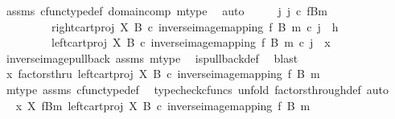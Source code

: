 \begin{isabellebody}
\ assms\ cfunc{\isacharunderscore}{\kern0pt}type{\isacharunderscore}{\kern0pt}def\ domain{\isacharunderscore}{\kern0pt}comp\ m{\isacharunderscore}{\kern0pt}type\ \isamarkupfalse%
\ auto\isanewline
\ \ \isamarkupfalse%
\ \isamarkupfalse%
\ {\isachardoublequoteopen}{\isasymexists}j{\isachardot}{\kern0pt}\ j\ {\isasymin}\isactrlsub c\ {\isacharparenleft}{\kern0pt}f\isactrlsup {\isacharminus}{\kern0pt}B{\isasymrparr}\isactrlbsub m\isactrlesub {\isacharparenright}{\kern0pt}\ {\isasymand}\isanewline
\ \ \ \ \ \ \ \ \ {\isacharparenleft}{\kern0pt}right{\isacharunderscore}{\kern0pt}cart{\isacharunderscore}{\kern0pt}proj\ X\ B\ {\isasymcirc}\isactrlsub c\ inverse{\isacharunderscore}{\kern0pt}image{\isacharunderscore}{\kern0pt}mapping\ f\ B\ m{\isacharparenright}{\kern0pt}\ {\isasymcirc}\isactrlsub c\ j\ {\isacharequal}{\kern0pt}\ h\ {\isasymand}\isanewline
\ \ \ \ \ \ \ \ \ {\isacharparenleft}{\kern0pt}left{\isacharunderscore}{\kern0pt}cart{\isacharunderscore}{\kern0pt}proj\ X\ B\ {\isasymcirc}\isactrlsub c\ inverse{\isacharunderscore}{\kern0pt}image{\isacharunderscore}{\kern0pt}mapping\ f\ B\ m{\isacharparenright}{\kern0pt}\ {\isasymcirc}\isactrlsub c\ j\ {\isacharequal}{\kern0pt}\ x{\isachardoublequoteclose}\isanewline
\ \ \ \ \isamarkupfalse%
\ inverse{\isacharunderscore}{\kern0pt}image{\isacharunderscore}{\kern0pt}pullback\ assms\ m{\isacharunderscore}{\kern0pt}type\ \isamarkupfalse%
\ is{\isacharunderscore}{\kern0pt}pullback{\isacharunderscore}{\kern0pt}def\ \isamarkupfalse%
\ blast\isanewline
\ \ \isamarkupfalse%
\ \isamarkupfalse%
\ {\isachardoublequoteopen}x\ factorsthru\ {\isacharparenleft}{\kern0pt}left{\isacharunderscore}{\kern0pt}cart{\isacharunderscore}{\kern0pt}proj\ X\ B\ {\isasymcirc}\isactrlsub c\ inverse{\isacharunderscore}{\kern0pt}image{\isacharunderscore}{\kern0pt}mapping\ f\ B\ m{\isacharparenright}{\kern0pt}{\isachardoublequoteclose}\isanewline
\ \ \ \ \isamarkupfalse%
\ m{\isacharunderscore}{\kern0pt}type\ assms\ cfunc{\isacharunderscore}{\kern0pt}type{\isacharunderscore}{\kern0pt}def\ \isamarkupfalse%
\ {\isacharparenleft}{\kern0pt}typecheck{\isacharunderscore}{\kern0pt}cfuncs{\isacharcomma}{\kern0pt}\ unfold\ factors{\isacharunderscore}{\kern0pt}through{\isacharunderscore}{\kern0pt}def{\isacharcomma}{\kern0pt}\ auto{\isacharparenright}{\kern0pt}\isanewline
\ \ \isamarkupfalse%
\ \isamarkupfalse%
\ {\isachardoublequoteopen}x\ {\isasymin}\isactrlbsub X\isactrlesub \ {\isacharparenleft}{\kern0pt}f\isactrlsup {\isacharminus}{\kern0pt}B{\isasymrparr}\isactrlbsub m\isactrlesub {\isacharcomma}{\kern0pt}\ left{\isacharunderscore}{\kern0pt}cart{\isacharunderscore}{\kern0pt}proj\ X\ B\ {\isasymcirc}\isactrlsub c\ inverse{\isacharunderscore}{\kern0pt}image{\isacharunderscore}{\kern0pt}mapping\ f\ B\ m{\isacharparenright}{\kern0pt}{\isachardoublequoteclose}\isanewline

\end{isabellebody}
